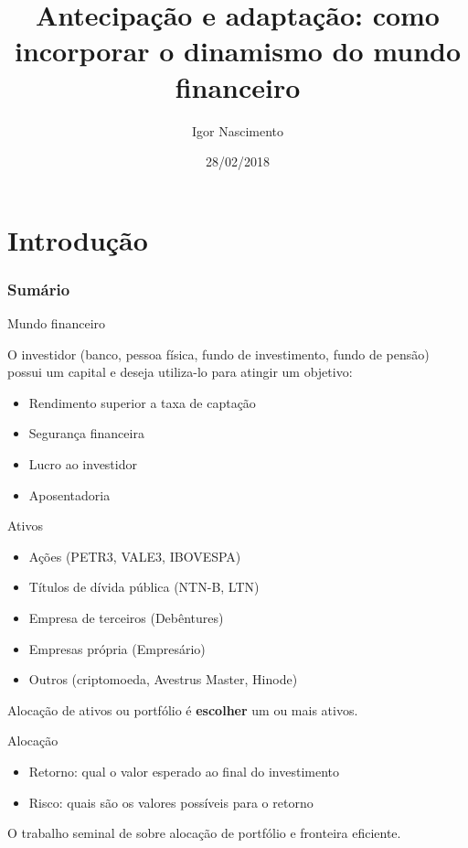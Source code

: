 \documentclass{beamer}
\title[Artigo]{Antecipação e adaptação: como incorporar o dinamismo do mundo financeiro}
\author[Igor Nascimento]{Igor Nascimento}
\institute[LAMFO]{Laboratório de Aprendizado de Máquina em Finanças e Organizações - LAMFO}
\date[2018]{28/02/2018}
\begin{document}
\begin{frame}
  \titlepage
\end{frame}

\section{Introdução}

\begin{frame}
\frametitle{Sumário}
\tableofcontents
\end{frame}




\begin{frame}{Mundo financeiro}

O investidor (banco, pessoa física, fundo de investimento, fundo de pensão) possui um capital e deseja utiliza-lo para atingir um objetivo:

\begin{itemize}
\item Rendimento superior a taxa de captação 
\item Segurança financeira
\item Lucro ao investidor
\item Aposentadoria
\end{itemize}

\end{frame}




\begin{frame}{Ativos}

\begin{itemize}
\item Ações (PETR3, VALE3, IBOVESPA)
\pause
\item Títulos de dívida pública (NTN-B, LTN)
\pause
\item Empresa de terceiros (Debêntures)
\pause
\item Empresas própria (Empresário)
\pause
\item Outros (criptomoeda, Avestrus Master, Hinode)
\end{itemize}

Alocação de ativos ou portfólio é \textbf{escolher} um ou mais ativos.


\end{frame}


\begin{frame}{Alocação}

\begin{itemize}
\item Retorno: qual o valor esperado ao final do investimento
\item Risco:   quais são os valores possíveis para o retorno
\end{itemize}

O trabalho seminal de \cite{mkv} sobre alocação de portfólio e fronteira eficiente.

\end{frame}
\end{document}
